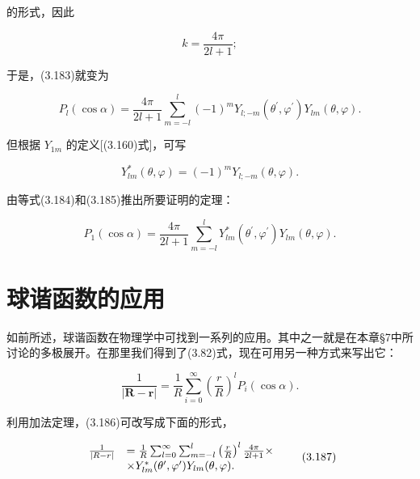 的形式，因此

\begin{equation*}
k = \frac {4 \pi}{2 l + 1};
\end{equation*}

于是，(3.183)就变为

\begin{equation*}
P _ {l} (\cos \alpha) = \frac {4 \pi}{2 l + 1} \sum_ {m = - l} ^ {l} (- 1) ^ {m} Y _ {l; - m} \left(\theta^ {\prime}, \varphi^ {\prime}\right) Y _ {l m} (\theta , \varphi).\tag{3.184}
\end{equation*}

但根据 $Y_{1m}$ 的定义[(3.160)式]，可写

\begin{equation*}
Y _ {l m} ^ {*} (\theta , \varphi) = (- 1) ^ {m} Y _ {l; - m} (\theta , \varphi).\tag{3.185}
\end{equation*}

由等式(3.184)和(3.185)推出所要证明的定理：

\begin{equation*}
P _ {1} (\cos \alpha) = \frac {4 \pi}{2 l + 1} \sum_ {m = - l} ^ {l} Y _ {l m} ^ {*} \left(\theta^ {\prime}, \varphi^ {\prime}\right) Y _ {l m} (\theta , \varphi).
\end{equation*}

\section{球谐函数的应用}

如前所述，球谐函数在物理学中可找到一系列的应用。其中之一就是在本章§7中所讨论的多极展开。在那里我们得到了(3.82)式，现在可用另一种方式来写出它：

\begin{equation*}
\frac {1}{| \boldsymbol {R} - \boldsymbol {r} |} = \frac {1}{R} \sum_ {i = 0} ^ {\infty} \left(\frac {r}{R}\right) ^ {l} P _ {i} (\cos \alpha).\tag{3.186}
\end{equation*}

利用加法定理，(3.186)可改写成下面的形式，

\begin{equation*}
\begin{array}{r l} \frac {1}{| R - r |} & = \frac {1}{R} \sum_ {l = 0} ^ {\infty} \sum_ {m = - l} ^ {l} \left(\frac {r}{R}\right) ^ {l} \frac {4 \pi}{2 l + 1} \times \\ & \times Y _ {l m} ^ {*} (\theta^ {\prime}, \varphi^ {\prime}) Y _ {l m} (\theta , \varphi). \end{array}\tag{3.187}
\end{equation*}

